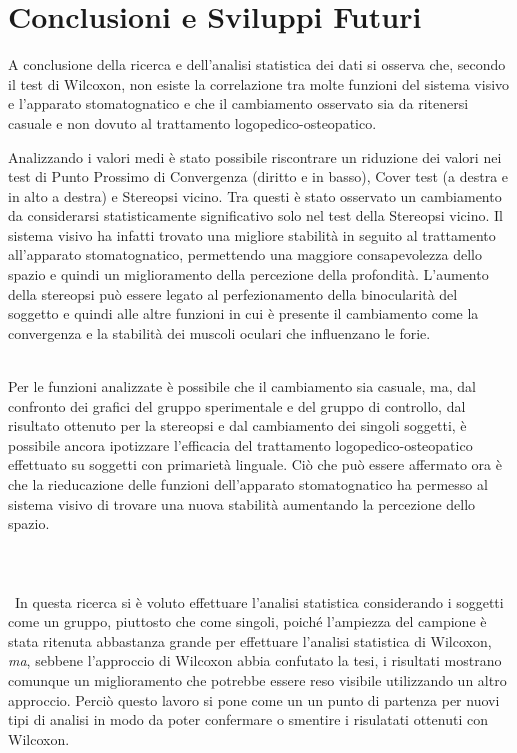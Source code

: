 \chapter{Conclusioni e Sviluppi Futuri}

A conclusione della ricerca e dell’analisi statistica dei dati si osserva che, secondo il test di Wilcoxon, non esiste la correlazione tra molte funzioni del sistema visivo e l’apparato stomatognatico e che il cambiamento osservato sia da ritenersi casuale e non dovuto al trattamento logopedico-osteopatico.
 
Analizzando i valori medi è stato possibile riscontrare un riduzione dei valori nei test di Punto Prossimo di Convergenza (diritto e in basso), Cover test (a destra e in alto a destra) e Stereopsi vicino. Tra questi è stato osservato un cambiamento da considerarsi statisticamente significativo solo nel test della Stereopsi vicino. Il sistema visivo ha infatti trovato una migliore stabilità in seguito al trattamento all’apparato stomatognatico, permettendo una maggiore consapevolezza dello spazio e quindi un miglioramento della percezione della profondità. L’aumento della stereopsi può essere legato al perfezionamento della binocularità del soggetto e quindi alle altre funzioni in cui è presente il cambiamento come la convergenza e la stabilità dei muscoli oculari che influenzano le forie.
\\\

Per le funzioni analizzate è possibile che il cambiamento sia casuale, ma, dal confronto dei grafici del gruppo sperimentale e del gruppo di controllo, dal risultato ottenuto per la stereopsi e dal cambiamento dei singoli soggetti, è possibile ancora ipotizzare l’efficacia del trattamento logopedico-osteopatico effettuato su soggetti con primarietà linguale. Ciò che può essere affermato ora è che la rieducazione delle funzioni dell’apparato stomatognatico ha permesso al sistema visivo di trovare una nuova stabilità aumentando la percezione dello spazio.
\\\ \\\ \\\ \\\
In questa ricerca si è voluto effettuare l’analisi statistica considerando i soggetti come un gruppo, piuttosto che come singoli, poiché l’ampiezza del campione è stata ritenuta abbastanza grande per effettuare l’analisi statistica di Wilcoxon, \emph{ma}, sebbene l’approccio di  Wilcoxon  abbia confutato la tesi, i risultati mostrano comunque un miglioramento che potrebbe essere reso visibile utilizzando un altro approccio. Perciò questo lavoro si pone come un un punto di partenza per nuovi tipi di analisi in modo da poter confermare o smentire i risulatati ottenuti con Wilcoxon.
\\\ \\\ \\\ \\\
